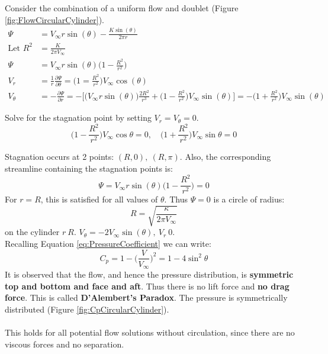 \documentclass[draft=false, titlepage]{article}
\newcommand{\partialfrac}[2]{\frac{\partial #1}{\partial #2}}
\begin{document}
Consider the combination of a uniform flow and doublet (Figure \ref{fig:FlowCircularCylinder}).
\begin{align*}
    \Psi &= V_\infty r\sin(\theta) - \frac{K\sin(\theta)}{2\pi r}\\
    \text{Let } R^2 &= \frac{K}{2\pi V_\infty}\\
    \Psi &= V_\infty r\sin(\theta)\big( 1-\frac{R^2}{r^2} \big)\\
    V_r &= \frac{1}{r} \partialfrac{\Psi}{\theta} = \Big(1=\frac{R^2}{r^2}\Big)  V_\infty \cos(\theta)\\
    V_\theta &= -\partialfrac{\Psi}{r} = -\Big[ \big( V_\infty r\sin(\theta) \big)\frac{2R^2}{r^3} + \big( 1-\frac{R^2}{r^2} \big) V_\infty \sin(\theta) \Big] = -\Big( 1+\frac{R^2}{r^2} \Big) V_\infty \sin(\theta)
\end{align*}

Solve for the stagnation point by setting $V_r = V_\theta = 0$.
\begin{equation*}
    \Big( 1-\frac{R^2}{r^2} \Big) V_\infty \cos\theta = 0, \quad \Big( 1 + \frac{R^2}{r^2} \Big) V_\infty \sin\theta = 0
\end{equation*}

Stagnation occurs at 2 points: $(R,0),\ (R,\pi)$. Also, the corresponding streamline containing the stagnation points is:
\begin{equation*}
    \Psi = V_\infty r \sin(\theta)\big( 1-\frac{R^2}{r^2}\big) = 0
\end{equation*}
For $r=R$, this is satisfied for all values of $\theta$. Thus $\Psi = 0$ is a circle of radius:
\begin{equation*}
    R = \sqrt{\frac{\kappa}{2\pi V_\infty}}
\end{equation*}
on the cylinder $r \ R$. $V_\theta = -2V_\infty \sin(\theta),\ V_r \ 0$.\\

Recalling Equation \ref{eq:PressureCoefficient} we can write:
\begin{equation*}
    C_p = 1-\Big(\frac{V}{V_\infty}\Big)^2 = 1-4\sin^2\theta
\end{equation*}
It is observed that the flow, and hence the pressure distribution, is \textbf{symmetric top and bottom and face and aft}. Thus there is no lift force and \textbf{no drag force}. This is called \textbf{D'Alembert's Paradox}. The pressure is symmetrically distributed (Figure \ref{fig:CpCircularCylinder}).
\paragraph*{} This holds for all potential flow solutions without circulation, since there are no viscous forces and no separation.
\end{document}

